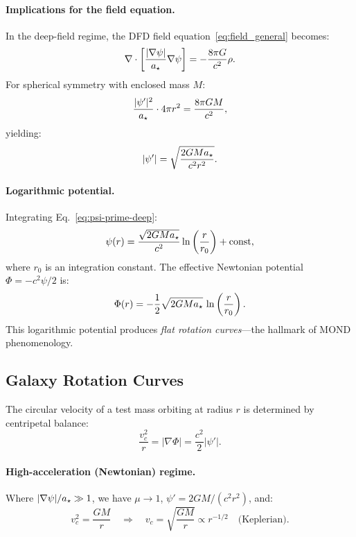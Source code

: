 \paragraph{Implications for the field equation.}
In the deep-field regime, the DFD field equation~\eqref{eq:field_general} becomes:
\begin{equation}
\nabla \cdot \left[\frac{|\nabla\psi|}{a_\star}\nabla\psi\right] = -\frac{8\pi G}{c^2}\rho.
\end{equation}
For spherical symmetry with enclosed mass $M$:
\begin{equation}
\frac{|\psi'|^2}{a_\star} \cdot 4\pi r^2 = \frac{8\pi G M}{c^2},
\end{equation}
yielding:
\begin{equation}\label{eq:psi-prime-deep}
|\psi'| = \sqrt{\frac{2GMa_\star}{c^2 r^2}}.
\end{equation}

\paragraph{Logarithmic potential.}
Integrating Eq.~\eqref{eq:psi-prime-deep}:
\begin{equation}\label{eq:log-potential}
\psi(r) = \frac{\sqrt{2GMa_\star}}{c^2}\ln\left(\frac{r}{r_0}\right) + \text{const},
\end{equation}
where $r_0$ is an integration constant. The effective Newtonian potential $\Phi = -c^2\psi/2$ is:
\begin{equation}
\Phi(r) = -\frac{1}{2}\sqrt{2GMa_\star}\,\ln\left(\frac{r}{r_0}\right).
\end{equation}
This logarithmic potential produces \textit{flat rotation curves}---the hallmark of MOND phenomenology.

\subsection{Galaxy Rotation Curves}\label{sec:galactic-rotation}

The circular velocity of a test mass orbiting at radius $r$ is determined by centripetal balance:
\begin{equation}
\frac{v_c^2}{r} = |\nabla\Phi| = \frac{c^2}{2}|\psi'|.
\end{equation}

\paragraph{High-acceleration (Newtonian) regime.}
Where $|\nabla\psi|/a_\star \gg 1$, we have $\mu \to 1$, $\psi' = 2GM/(c^2 r^2)$, and:
\begin{equation}
v_c^2 = \frac{GM}{r} \quad \Rightarrow \quad v_c = \sqrt{\frac{GM}{r}} \propto r^{-1/2} \quad \text{(Keplerian)}.
\end{equation}

